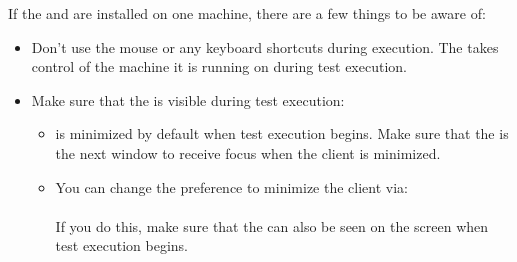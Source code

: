 

If the \jbclient{}  and \gdagent{} are installed on one machine, there are a few things to be aware of:
\begin{itemize}
\item Don't use the mouse or any keyboard shortcuts during execution. The \gdaut{} takes control of the machine it is running on during test execution.
\item Make sure that the \gdaut{} is visible during test execution:
\begin{itemize}
\item \jb{}is minimized by default when test execution begins. Make sure that the \gdaut{} is the next window to receive focus when the client is minimized. 
\item You can change the preference to minimize the client via:\\
\\
If you do this, make sure that the \gdaut{} can also be seen on the screen when test execution begins. 
 \end{itemize}
\end{itemize}
